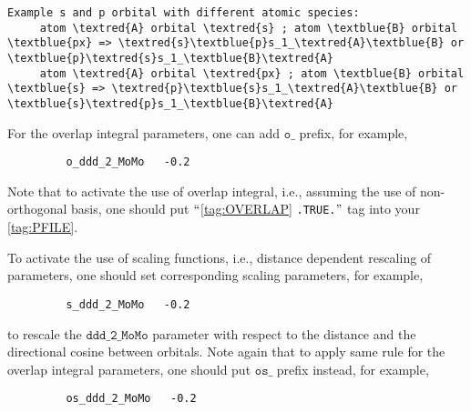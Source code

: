 \documentclass[a4paper,12pt]{scrartcl}
\newcommand{\textred}[1]{\textcolor{red!85!white}{\texttt{#1}}}
\newcommand{\textblue}[1]{\textcolor{blue!85!white}{\texttt{#1}}}
\begin{document}
\begin{description}
        \begin{Verbatim}[commandchars=\\\{\}]
     Example s and p orbital with different atomic species:
     atom \textred{A} orbital \textred{s} ; atom \textblue{B} orbital \textblue{px} => \textred{s}\textblue{p}s_1_\textred{A}\textblue{B} or \textblue{p}\textred{s}s_1_\textblue{B}\textred{A} 
     atom \textred{A} orbital \textred{px} ; atom \textblue{B} orbital \textblue{s} => \textred{p}\textblue{s}s_1_\textred{A}\textblue{B} or \textblue{s}\textred{p}s_1_\textblue{B}\textred{A} 
        \end{Verbatim}
       


         For the overlap integral parameters, one can add $\texttt{o\_}$ prefix, for example,
        \begin{verbatim}
         o_ddd_2_MoMo   -0.2
        \end{verbatim}
         Note that to activate the use of overlap integral, i.e., assuming the use of non-orthogonal basis, 
         one should put $``$\ref{tag:OVERLAP} \texttt{.TRUE.}$"$ tag into your \ref{tag:PFILE}.
        
        
         To activate the use of scaling functions, i.e., distance dependent rescaling of parameters, 
         one should set corresponding scaling parameters, for example, 
         \begin{verbatim}
         s_ddd_2_MoMo   -0.2
         \end{verbatim}
         to rescale the $\texttt{ddd\_2\_MoMo}$ parameter with respect to the distance and the directional cosine between orbitals. Note again that to apply same rule for the overlap 
         integral parameters, one should put $\texttt{os\_}$ prefix instead, for example,
         \begin{verbatim}
         os_ddd_2_MoMo   -0.2
         \end{verbatim}
        

\end{description}
\end{document}
